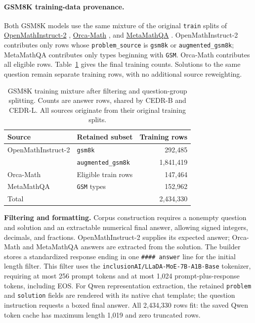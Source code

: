 \documentclass[11pt,letterpaper]{article}
\begin{document}
\paragraph{GSM8K training-data provenance.}
Both GSM8K models use the same mixture of the original \texttt{train} splits of \href{https://huggingface.co/datasets/nvidia/OpenMathInstruct-2}{OpenMathInstruct-2} \citep{openmath}, \href{https://huggingface.co/datasets/microsoft/orca-math-word-problems-200k}{Orca-Math} \citep{orcamath}, and \href{https://huggingface.co/datasets/meta-math/MetaMathQA}{MetaMathQA} \citep{metamath}. OpenMathInstruct-2 contributes only rows whose \texttt{problem\_source} is \texttt{gsm8k} or \texttt{augmented\_gsm8k}; MetaMathQA contributes only types beginning with \texttt{GSM}. Orca-Math contributes all eligible rows. Table~\ref{tab:gsmtrainingmixture} gives the final training counts. Solutions to the same question remain separate training rows, with no additional source reweighting.

\begin{table}[!htb]
\centering\small
\setlength{\tabcolsep}{6pt}
\caption{GSM8K training mixture after filtering and question-group splitting. Counts are answer rows, shared by CEDR-B and CEDR-L. All sources originate from their original training splits.}
\label{tab:gsmtrainingmixture}
\begin{tabular}{@{}llr@{}}
\toprule
Source & Retained subset & Training rows\\
\midrule
OpenMathInstruct-2 & \texttt{gsm8k} & 292,485\\
 & \texttt{augmented\_gsm8k} & 1,841,419\\
Orca-Math & Eligible train rows & 147,464\\
MetaMathQA & \texttt{GSM} types & 152,962\\
\midrule
Total & & 2,434,330\\
\bottomrule
\end{tabular}
\end{table}

\textbf{Filtering and formatting.} Corpus construction requires a nonempty question and solution and an extractable numerical final answer, allowing signed integers, decimals, and fractions. OpenMathInstruct-2 supplies its expected answer; Orca-Math and MetaMathQA answers are extracted from the solution. The builder stores a standardized response ending in one \texttt{\#\#\#\# answer} line for the initial length filter. This filter uses the \texttt{inclusionAI/LLaDA-MoE-7B-A1B-Base} tokenizer, requiring at most 256 prompt tokens and at most 1,024 prompt-plus-response tokens, including EOS. For Qwen representation extraction, the retained \texttt{problem} and \texttt{solution} fields are rendered with its native chat template; the question instruction requests a boxed final answer. All 2,434,330 rows fit: the saved Qwen token cache has maximum length 1,019 and zero truncated rows.
\end{document}
